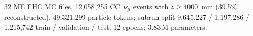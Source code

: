 32 ME FHC MC files, 12{,}058{,}255 CC~$\nu_\mu$ events with $z \ge 4000$~mm (39.5\% reconstructed), 49{,}321{,}299 particle tokens; subrun split 9{,}645{,}227 / 1{,}197{,}286 / 1{,}215{,}742 train / validation / test; 12 epochs; 3.83\,M parameters.
